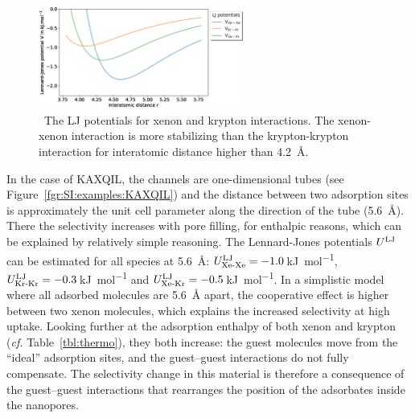 \documentclass[main.tex]{subfiles}
\begin{document}
\begin{figure}[ht]
  \centering
    \includegraphics[width=0.6\textwidth]{figures/2-thermo/lennard_jones.jpg}
    \caption{\ The LJ potentials for xenon and krypton interactions. The xenon-xenon interaction is more stabilizing than the krypton-krypton interaction for interatomic distance higher than \SI{4.2}{\angstrom}.}\label{fgr:LJ}
  \end{figure}

In the case of KAXQIL, the channels are one-dimensional tubes (see Figure~\ref{fgr:SI:examples:KAXQIL}) and the distance between two adsorption sites is approximately the unit cell parameter along the direction of the tube (\SI{5.6}{\angstrom}). There the selectivity increases with pore filling, for enthalpic reasons, which can be explained by relatively simple reasoning. The Lennard-Jones potentials $U^{\text{LJ}}$ can be estimated for all species at \SI{5.6}{\angstrom}: $U^{\text{LJ}}_{\text{Xe-Xe}}=-1.0$\,\si{\kilo\joule\per\mol}, $U^{\text{LJ}}_{\text{Kr-Kr}}=-0.3$\,\si{\kilo\joule\per\mol} and $U^{\text{LJ}}_{\text{Xe-Kr}}=-0.5$\,\si{\kilo\joule\per\mol}. In a simplistic model where all adsorbed molecules are \SI{5.6}{\angstrom} apart, the cooperative effect is higher between two xenon molecules, which explains the increased selectivity at high uptake. Looking further at the adsorption enthalpy of both xenon and krypton (\emph{cf.} Table~\ref{tbl:thermo}), they both increase: the guest molecules move from the ``ideal'' adsorption sites, and the guest--guest interactions do not fully compensate. The selectivity change in this material is therefore a consequence of the guest--guest interactions that rearranges the position of the adsorbates inside the nanopores.
\end{document}
